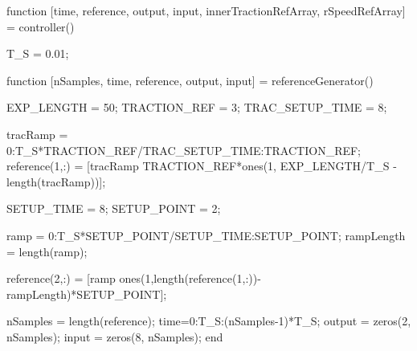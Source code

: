 \begin{matlabcode}
function [time, reference, output, input, innerTractionRefArray, rSpeedRefArray] = controller()


  T_S = 0.01;%


  function [nSamples, time, reference, output, input] = referenceGenerator()

    EXP_LENGTH = 50;%
    TRACTION_REF = 3;
    TRAC_SETUP_TIME = 8;

    tracRamp = 0:T_S*TRACTION_REF/TRAC_SETUP_TIME:TRACTION_REF;
    reference(1,:) = [tracRamp TRACTION_REF*ones(1, EXP_LENGTH/T_S - length(tracRamp))];

    SETUP_TIME = 8;%
    SETUP_POINT = 2;%

    ramp = 0:T_S*SETUP_POINT/SETUP_TIME:SETUP_POINT;
    rampLength = length(ramp);

    reference(2,:) = [ramp ones(1,length(reference(1,:))-rampLength)*SETUP_POINT];

    nSamples = length(reference);
    time=0:T_S:(nSamples-1)*T_S;
    output = zeros(2, nSamples);
    input = zeros(8, nSamples);
  end
\end{matlabcode}
\clearpage
